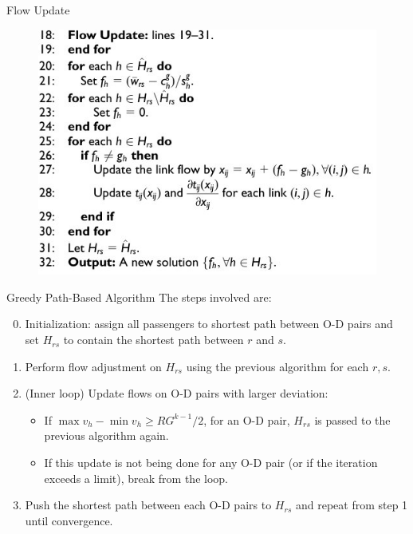 \documentclass{beamer}
\begin{document}
\begin{frame}{Flow Update}
    \begin{figure}
    \includegraphics[width=\textwidth]{./alg13.jpg}
    \end{figure}
\end{frame}

\begin{frame}{Greedy Path-Based Algorithm}
The steps involved are:
\begin{enumerate}
\setcounter{enumi}{-1}
    \item Initialization: assign all passengers to shortest
    path between O-D pairs and set $H_{rs}$ to contain
    the shortest path between $r$ and $s$.

    \item Perform flow adjustment on $H_{rs}$ using the
    previous algorithm for each $r,s$.

    \item (Inner loop) Update flows on O-D pairs with larger deviation:
    \begin{itemize}
    \item If $\max{v_h} - \min{v_h}\geq RG^{k-1}/2$,
    for an O-D pair, $H_{rs}$ is passed to the previous
    algorithm again.

    \item If this update is not being done for any
    O-D pair (or if the iteration exceeds a limit),
    break from the loop.
    \end{itemize}

    \item Push the shortest path between each O-D pairs to
    $H_{rs}$ and repeat from step 1 until convergence.
\end{enumerate}
\end{frame}
\end{document}
